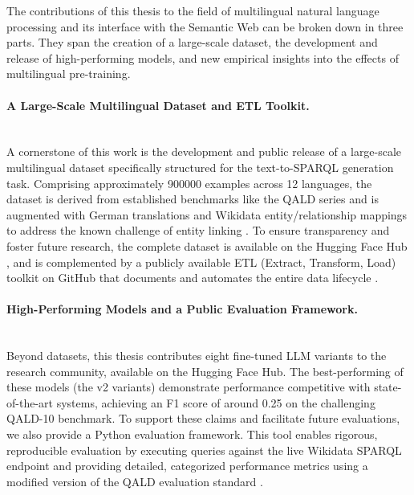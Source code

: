 The contributions of this thesis to the field of multilingual natural language processing and its interface with the Semantic Web can be broken down in three parts. 
They span the creation of a large-scale dataset, the development and release of high-performing models, and new empirical insights into the effects of multilingual pre-training.

\paragraph{\textbf{A Large-Scale Multilingual Dataset and ETL Toolkit.}} \mbox{}\\
A cornerstone of this work is the development and public release of a large-scale multilingual dataset specifically structured for the text-to-SPARQL generation task. 
Comprising approximately 900000 examples across 12 languages, the dataset is derived from established benchmarks like the QALD series \cite{usbeck2024qald} and is augmented with German translations and Wikidata entity/relationship mappings to address the known challenge of entity linking \cite{brei2024leveraging}. 
To ensure transparency and foster future research, the complete dataset is available on the Hugging Face Hub \cite{lhoest2021datasets}, and is complemented by a publicly available ETL (Extract, Transform, Load) toolkit on GitHub that documents and automates the entire data lifecycle \cite{QALD_repository, jiang2022knowledge}.

\paragraph{\textbf{High-Performing Models and a Public Evaluation Framework.}} \mbox{}\\
Beyond datasets, this thesis contributes eight fine-tuned LLM variants to the research community, available on the Hugging Face Hub. 
The best-performing of these models (the v2 variants) demonstrate performance competitive with state-of-the-art systems, achieving an F1 score of around 0.25 on the challenging QALD-10 benchmark. 
To support these claims and facilitate future evaluations, we also provide a Python evaluation framework. This tool enables rigorous, reproducible evaluation by executing queries against the live Wikidata SPARQL endpoint and providing detailed, categorized performance metrics using a modified version of the QALD evaluation standard \cite{usbeck2019benchmarking}.

